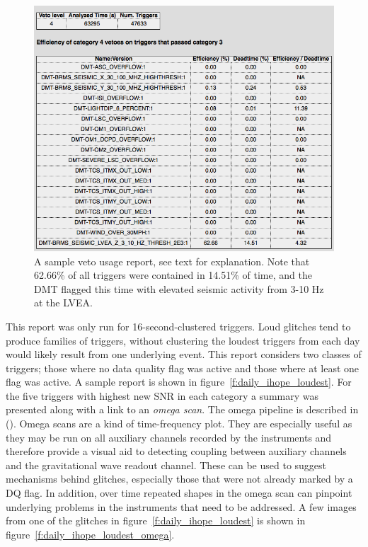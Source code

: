 \begin{figure}
  \includegraphics[width=\linewidth]{figures/detchar/vetousage.png}
  \caption[Sample veto usage report from Aug 19, 2010]{
  \label{f:daily_ihope_vetousage}
A sample veto usage report, see text for explanation.  Note that 62.66\% of
all triggers were contained in 14.51\% of time, and the DMT flagged this time
with elevated seismic activity from 3-10 Hz at the LVEA.}
\end{figure}%


This report was only run for 16-second-clustered triggers.  Loud
glitches tend to produce families of triggers, without clustering the
loudest triggers from each day would likely result from one underlying
event.  This report considers two classes of triggers; those where no
data quality flag was active and those where at least one flag was
active.  A sample report is shown in
figure~\ref{f:daily_ihope_loudest}.  For the five triggers with
highest new SNR in each category a summary was presented along with a
link to an \emph{omega scan}.  The omega pipeline is described in
().  Omega scans are a kind of time-frequency
plot.  They are especially useful as they may be run on all auxiliary
channels recorded by the instruments and therefore provide a visual
aid to detecting coupling between auxiliary channels and the
gravitational wave readout channel.  These can be used to suggest
mechanisms behind glitches, especially those that were not already
marked by a DQ flag.  In addition, over time repeated shapes in the
omega scan can pinpoint underlying problems in the instruments that
need to be addressed.  A few images from one of the glitches in
figure~\ref{f:daily_ihope_loudest} is shown in
figure~\ref{f:daily_ihope_loudest_omega}.

